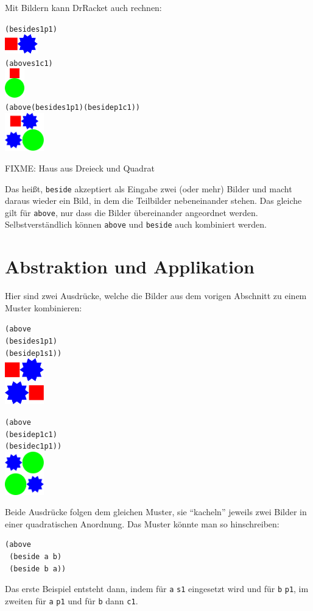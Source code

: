 %
Mit Bildern kann DrRacket auch rechnen:
%
\begin{alltt}
(beside s1 p1)
\evalsto{} \includegraphics[height=24pt]{i1prog/beside.png}
(above s1 c1)
\evalsto{} \includegraphics[width=24pt]{i1prog/above.png}
(above (beside s1 p1) (beside p1 c1))
\evalsto{} \includegraphics[width=48pt]{i1prog/abovebeside.png}
\end{alltt}
%
FIXME: Haus aus Dreieck und Quadrat

Das heißt, \texttt{beside} akzeptiert als Eingabe zwei (oder mehr)
Bilder und macht daraus wieder ein Bild, in dem die Teilbilder
nebeneinander stehen.  Das gleiche gilt für \texttt{above}, nur dass
die Bilder übereinander angeordnet werden.  Selbstverständlich können
\texttt{above} und \texttt{beside} auch kombiniert werden.

\section{Abstraktion und Applikation}
\label{sec:abstraktion-und-applikation}

Hier sind zwei Ausdrücke, welche die Bilder aus dem vorigen Abschnitt
zu einem Muster kombinieren:
%
\begin{alltt}
(above
 (beside s1 p1)
 (beside p1 s1))
\evalsto{} \includegraphics[width=48pt]{i1prog/tile1}

(above
 (beside p1 c1)
 (beside c1 p1))
\evalsto{} \includegraphics[width=48pt]{i1prog/tile2}
\end{alltt}
%
Beide Ausdrücke folgen dem gleichen Muster, sie "`kacheln"' jeweils zwei
Bilder in einer quadratischen Anordnung.  Das Muster könnte man so
hinschreiben:
%
\begin{verbatim}
(above
 (beside a b)
 (beside b a))
\end{verbatim}
%
Das erste Beispiel entsteht dann, indem für \texttt{a} \texttt{s1}
eingesetzt wird und für \texttt{b} \texttt{p1}, im zweiten für \texttt{a}
\texttt{p1} und für \texttt{b} dann \texttt{c1}.

